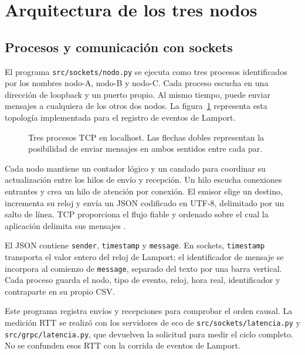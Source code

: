 \section{Arquitectura de los tres nodos}
\label{sec:arquitectura}
\begingroup
\setlength{\emergencystretch}{2em}

\subsection{Procesos y comunicación con sockets}
El programa \texttt{src/sockets/nodo.py} se ejecuta como tres procesos
identificados por los nombres nodo-A, nodo-B y nodo-C. Cada proceso
escucha en una dirección de loopback y un puerto propio. Al mismo
tiempo, puede enviar mensajes a cualquiera de los otros dos nodos.
La figura~\ref{fig:arquitectura-nodos} representa esta topología
implementada para el registro de eventos de Lamport.

\begin{figure}[htbp]
\centering

\caption{Tres procesos TCP en localhost. Las flechas dobles representan
la posibilidad de enviar mensajes en ambos sentidos entre cada par.}
\label{fig:arquitectura-nodos}
\end{figure}

Cada nodo mantiene un contador lógico y un candado para coordinar su
actualización entre los hilos de envío y recepción. Un hilo escucha
conexiones entrantes y crea un hilo de atención por conexión.
El emisor elige un destino, incrementa su reloj y envía un JSON
codificado en UTF-8, delimitado por un salto de línea.
TCP proporciona el flujo fiable y ordenado sobre el cual la aplicación
delimita sus mensajes \cite{eddy2022tcp}.

El JSON contiene \texttt{sender}, \texttt{timestamp} y \texttt{message}.
En sockets, \texttt{timestamp} transporta el valor entero del reloj de
Lamport; el identificador de mensaje se incorpora al comienzo de
\texttt{message}, separado del texto por una barra vertical.
Cada proceso guarda el nodo, tipo de evento, reloj, hora real,
identificador y contraparte en su propio CSV.

Este programa registra envíos y recepciones para comprobar el orden
causal. La medición RTT se realizó con los servidores de eco de
\texttt{src/sockets/latencia.py} y \texttt{src/grpc/latencia.py},
que devuelven la solicitud para medir el ciclo completo. No se
confunden esos RTT con la corrida de eventos de Lamport.

